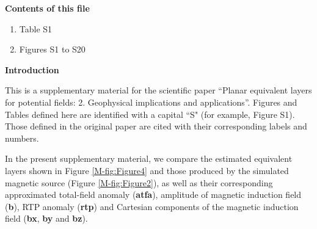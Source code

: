 \documentclass[draft,jgrga]{agutexSI2019}
\newcommand{\mainref}[1]{\ref{M-#1}}
\begin{document}
\begin{article}

%
%



\noindent\textbf{Contents of this file}
\begin{enumerate}
\item Table S1
\item Figures S1 to S20
\end{enumerate}

\noindent\textbf{Introduction}

This is a supplementary material for the scientific paper 
``Planar equivalent layers for potential fields: 2. Geophysical implications and 
applications''. 
Figures and Tables defined here are identified with a capital ``S" (for example, Figure S1). 
Those defined in the original paper are cited with their corresponding labels and numbers.

In the present supplementary material, we compare the estimated equivalent layers shown 
in Figure \mainref{fig:Figure4} and those produced by the simulated magnetic source (Figure
\mainref{fig:Figure2}), as well as their corresponding approximated total-field anomaly 
(\textbf{atfa}), amplitude of magnetic induction field (\textbf{b}), RTP anomaly 
(\textbf{rtp}) and Cartesian components of the magnetic induction field 
(\textbf{bx}, \textbf{by} and \textbf{bz}).


\end{article}
\end{document}
